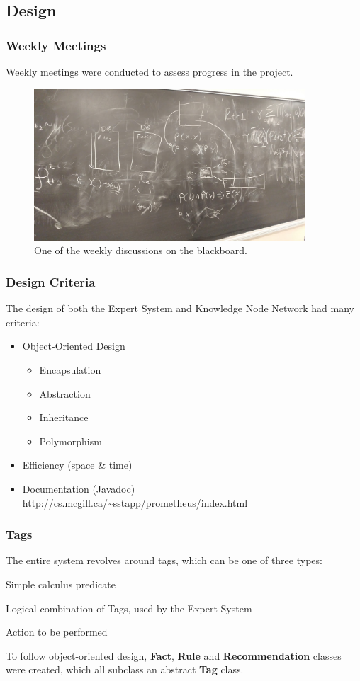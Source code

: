 \documentclass{beamer}
\begin{document}
	\subsection{Design}
	
	\begin{frame}
		\frametitle{Weekly Meetings}
		Weekly meetings were conducted to assess progress in the project.
		\begin{figure}
			\centering
			\includegraphics[width=0.9\textwidth]{figures/meeting.jpg}
			\caption
			{One of the weekly discussions on the blackboard.}
			\label{fig:meeting}
		\end{figure}
	\end{frame}
	
	\begin{frame}
		\frametitle{Design Criteria}
		The design of both the Expert System and Knowledge Node Network had many criteria:
		\begin{itemize}
			\item Object-Oriented Design
					\begin{itemize}
						\item Encapsulation
						\item Abstraction
						\item Inheritance
						\item Polymorphism
					\end{itemize}
			\item Efficiency (space \& time)
			\item Documentation (Javadoc) \url{http://cs.mcgill.ca/~sstapp/prometheus/index.html}
		\end{itemize}
	\end{frame}

	\begin{frame}
		\frametitle{Tags}
		The entire system revolves around tags, which can be one of three types:
		\begin{description}[Recommendation]
			\item[Fact] Simple calculus predicate
			\item[Rule] Logical combination of Tags, used by the Expert System
			\item[Recommendation] Action to be performed
		\end{description}
		To follow object-oriented design, \textbf{Fact}, \textbf{Rule} and \textbf{Recommendation} classes were created, which all subclass an abstract \textbf{Tag} class.
	\end{frame}
\end{document}
